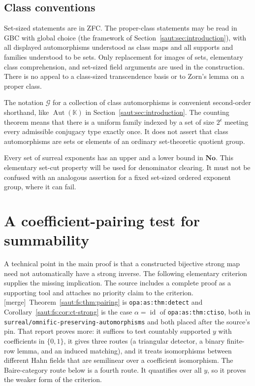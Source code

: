 \documentclass[11pt]{article}
\theoremstyle{definition}
\theoremstyle{remark}
\newcommand{\No}{\mathbf{No}}
\newcommand{\K}{\mathbb K}
\newcommand{\id}{\operatorname{id}}
\newcommand{\Aut}{\operatorname{Aut}}
\newcommand{\repo}[1]{\nolinkurl{#1}}%
\newcommand{\lbl}[1]{\nolinkurl{#1}}%
\newcommand{\cc}{\mathfrak c}
\newcommand{\mergetag}{\textup{[merge]}}
\numberwithin{equation}{section}
\begin{document}
\subsection{Class conventions}

Set-sized statements are in ZFC. The proper-class statements may be read in GBC
with global choice (the framework of Section~\ref{saut:sec:introduction}), with all
displayed automorphisms understood as class maps and all supports and families
understood to be sets. Only replacement for images of sets, elementary class
comprehension, and set-sized field arguments are used in the construction. There
is no appeal to a class-sized transcendence basis or to Zorn's lemma on a proper
class.

The notation $\mathcal G$ for a collection of class automorphisms is convenient
second-order shorthand, like $\Aut(\K)$ in Section~\ref{saut:sec:introduction}. The
counting theorem means that there is a uniform family indexed by a set of size
$2^{\cc}$ meeting every admissible conjugacy type exactly once. It does not assert
that class automorphisms are sets or elements of an ordinary set-theoretic quotient
group.

Every set of surreal exponents has an upper and a lower bound in $\No$. This
elementary set-cut property will be used for denominator clearing. It must not be
confused with an analogous assertion for a fixed set-sized ordered exponent group,
where it can fail.

\section{A coefficient-pairing test for summability}\label{saut:fs:sec:pairing}

A technical point in the main proof is that a constructed bijective strong map need
not automatically have a strong inverse. The following elementary criterion
supplies the missing implication. The source includes a complete proof as a
supporting tool and attaches no priority claim to the criterion.
\mergetag\ Theorem~\ref{saut:fs:thm:pairing} is \lbl{opa:as:thm:detect} and
Corollary~\ref{saut:fs:cor:ct-strong} is the case $\alpha=\id$ of
\lbl{opa:as:thm:ctiso}, both in \repo{surreal/omnific-preserving-automorphisms}
and both placed after the source's pin. That report proves more: it suffices to
test countably supported $y$ with coefficients in $\{0,1\}$, it gives three routes
(a triangular detector, a binary finite-row lemma, and an induced matching), and
it treats isomorphisms between different Hahn fields that are semilinear over a
coefficient isomorphism. The Baire-category route below is a fourth route. It
quantifies over all $y$, so it proves the weaker form of the criterion.
\end{document}
